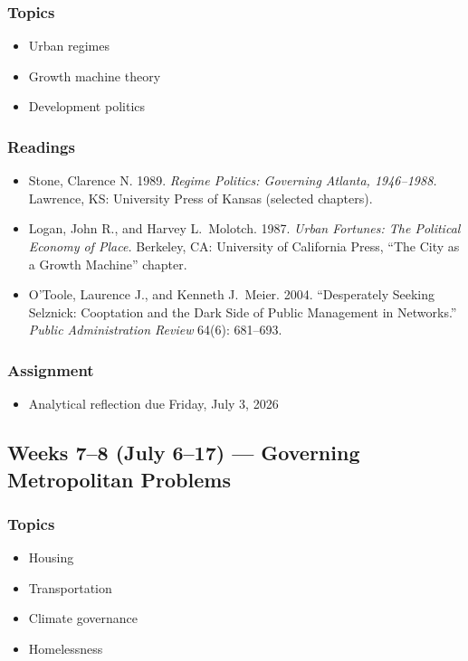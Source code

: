 \documentclass[12pt]{article}
\begin{document}
    \subsubsection*{Topics}
        \begin{itemize}
            \item Urban regimes
            \item Growth machine theory
            \item Development politics
        \end{itemize}
    \subsubsection*{Readings}
        \begin{itemize}
            \item Stone, Clarence N. 1989. \emph{Regime Politics: Governing Atlanta, 1946--1988.} Lawrence, KS: University Press of Kansas (selected chapters).
            \item Logan, John R., and Harvey L.\ Molotch. 1987. \emph{Urban Fortunes: The Political Economy of Place.} Berkeley, CA: University of California Press, ``The City as a Growth Machine'' chapter.
            \item O'Toole, Laurence J., and Kenneth J.\ Meier. 2004. ``Desperately Seeking Selznick: Cooptation and the Dark Side of Public Management in Networks.'' \emph{Public Administration Review} 64(6): 681--693.
        \end{itemize}
    \subsubsection*{Assignment}
        \begin{itemize}
            \item Analytical reflection due Friday, July 3, 2026
        \end{itemize}

\subsection*{Weeks 7--8 (July 6--17) --- Governing Metropolitan Problems}
    \subsubsection*{Topics}
        \begin{itemize}
            \item Housing
            \item Transportation
            \item Climate governance
            \item Homelessness
        \end{itemize}
\end{document}
